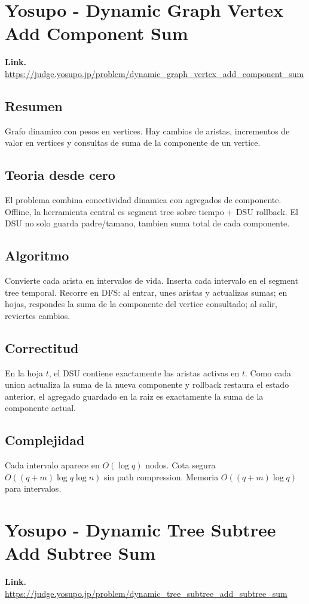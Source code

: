 \documentclass[10pt]{article}
\newcommand{\bigO}{O}
\begin{document}
\clearpage
\section{Yosupo - Dynamic Graph Vertex Add Component Sum}
\textbf{Link.} \url{https://judge.yosupo.jp/problem/dynamic_graph_vertex_add_component_sum}

\subsection*{Resumen}
Grafo dinamico con pesos en vertices. Hay cambios de aristas, incrementos de
valor en vertices y consultas de suma de la componente de un vertice.

\subsection*{Teoria desde cero}
El problema combina conectividad dinamica con agregados de componente. Offline,
la herramienta central es segment tree sobre tiempo + DSU rollback. El DSU no
solo guarda padre/tamano, tambien suma total de cada componente.

\subsection*{Algoritmo}
Convierte cada arista en intervalos de vida. Inserta cada intervalo en el
segment tree temporal. Recorre en DFS: al entrar, unes aristas y actualizas
sumas; en hojas, respondes la suma de la componente del vertice consultado; al
salir, reviertes cambios.

\subsection*{Correctitud}
En la hoja $t$, el DSU contiene exactamente las aristas activas en $t$. Como cada
union actualiza la suma de la nueva componente y rollback restaura el estado
anterior, el agregado guardado en la raiz es exactamente la suma de la componente
actual.

\subsection*{Complejidad}
Cada intervalo aparece en $\bigO(\log q)$ nodos. Cota segura
$\bigO((q+m)\log q\log n)$ sin path compression. Memoria
$\bigO((q+m)\log q)$ para intervalos.

\clearpage
\section{Yosupo - Dynamic Tree Subtree Add Subtree Sum}
\textbf{Link.} \url{https://judge.yosupo.jp/problem/dynamic_tree_subtree_add_subtree_sum}
\end{document}
